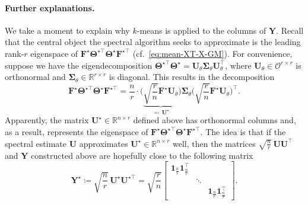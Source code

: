


\paragraph{Further explanations.}

We take a moment to explain why $k$-means is applied to the columns of $\bm{Y}$.
Recall that the central object the spectral algorithm seeks to approximate
is the leading rank-$r$ eigenspace of $\bm{F}^{\star}\bm{\Theta}^{\star\top}\bm{\Theta}^{\star}\bm{F}^{\star\top}$ (cf.~\eqref{eq:mean-XT-X-GM}).
For convenience, suppose we have the eigendecomposition  $\bm{\Theta}^{\star\top}\bm{\Theta}^{\star}=\bm{U}_{\theta}\bm{\Sigma}_{\theta}\bm{U}_{\theta}^{\top}$,
where $\bm{U}_{\theta}\in\mathcal{O}^{r\times r}$ is  orthonormal and $\bm{\Sigma}_{\theta}\in\mathbb{R}^{r\times r}$ is diagonal.
This results in the decomposition
%
\begin{equation}
\bm{F}^{\star}\bm{\Theta}^{\star\top}\bm{\Theta}^{\star}\bm{F}^{\star\top}=\frac{n}{r}\cdot\Big(\underset{\eqqcolon\,\bm{U}^{\star}}{\underbrace{\sqrt{\frac{r}{n}}\bm{F}^{\star}\bm{U}_{\theta}}}\Big)\bm{\Sigma}_{\theta}\Big(\sqrt{\frac{r}{n}}\bm{F}^{\star}\bm{U}_{\theta}\Big)^{\top}.
\label{eq:FTheta-Theta-F-eigenspace}
\end{equation}
%
Apparently, the matrix $\bm{U}^{\star}\in\mathbb{R}^{n\times r}$ defined above has orthonormal columns and, as a result,
represents the eigenspace of $\bm{F}^{\star}\bm{\Theta}^{\star\top}\bm{\Theta}^{\star}\bm{F}^{\star\top}$.
The idea is that if the spectral estimate $\bm{U}$ approximates $\bm{U}^{\star}\in\mathbb{R}^{n\times r}$ well,
then the matrices $\sqrt{\frac{n}{r}} \, \bm{U}\bm{U}^{\top}$ and $\bm{Y}$ constructed above are hopefully close to the following matrix
%
\begin{equation}
\bm{Y}^{\star}  \coloneqq  \sqrt{\frac{n}{r}} \, \bm{U}^{\star}\bm{U}^{\star\top}
= \sqrt{\frac{r}{n}} \left[\begin{array}{ccc}
\bm{1}_{\frac{n}{r}}\bm{1}_{\frac{n}{r}}^{\top}\\
 & \ddots\\
 &  & \bm{1}_{\frac{n}{r}}\bm{1}_{\frac{n}{r}}^{\top}
\end{array}\right].
\label{eq:Ystar-definition-GMM}
\end{equation}
